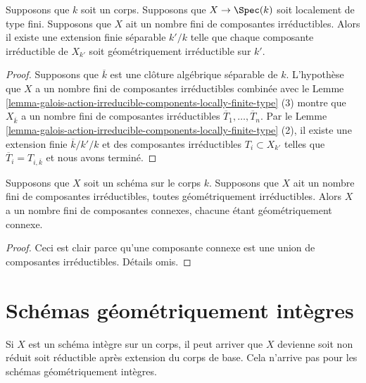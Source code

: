 \begin{lemma}
\label{lemma-finite-extension-geometrically-irreducible-components}
Supposons que $k$ soit un corps. Supposons que $X
\to \Spec(k)$ soit localement de type fini.
Supposons que $X$ ait un nombre fini de composantes
irréductibles. Alors il existe une extension finie
séparable $k'/k$ telle que chaque composante irréductible
de $X_{k'}$ soit géométriquement irréductible sur $k'$.
\end{lemma}

\begin{proof}
Supposons que $\overline{k}$ est une clôture algébrique
séparable de $k$. L'hypothèse que $X$ a un nombre fini de
composantes irréductibles combinée avec le Lemme
\ref{lemma-galois-action-irreducible-components-locally-finite-type}
(3) montre que $X_{\overline{k}}$ a un nombre fini de
composantes irréductibles $\overline{T}_1, \ldots,
\overline{T}_n$. Par le Lemme
\ref{lemma-galois-action-irreducible-components-locally-finite-type} (2), il existe
une extension finie $\overline{k}/k'/k$ et des composantes irréductibles $T_i
\subset X_{k'}$ telles que $\overline{T}_i = T_{i, \overline{k}}$ et nous avons terminé.
\end{proof}

\begin{lemma}
\label{lemma-irreducible-components-geometrically-irreducible}
Supposons que $X$ soit un schéma sur le corps
$k$. Supposons que $X$ ait un nombre fini de
composantes irréductibles, toutes géométriquement
irréductibles. Alors $X$ a un nombre fini de
composantes connexes, chacune étant géométriquement connexe.
\end{lemma}

\begin{proof}
Ceci est clair parce qu'une composante connexe est
une union de composantes irréductibles. Détails omis.
\end{proof}







\section{Schémas géométriquement intègres}
\label{section-geometrically-integral}

\noindent
Si $X$ est un schéma intègre sur un corps, il peut arriver que $X$
devienne soit non réduit soit réductible après extension du corps de
base. Cela n'arrive pas pour les schémas géométriquement intègres.

